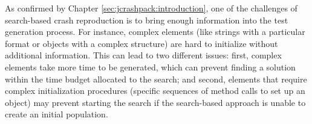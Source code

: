 



%
%


As confirmed by Chapter \ref{sec:jcrashpack:introduction}, one of the challenges of search-based crash reproduction is to bring enough information into the test generation process.
For instance, complex elements (like strings with a particular format or objects with a complex structure) are hard to initialize without additional information. 
This can lead to two different issues: first, complex elements take more time to be generated, which can prevent finding a solution within the time budget allocated to the search; and second, elements that require complex initialization procedures (\eg specific sequences of method calls to set up an object) may prevent starting the search if the search-based approach is unable to create an initial population. 

